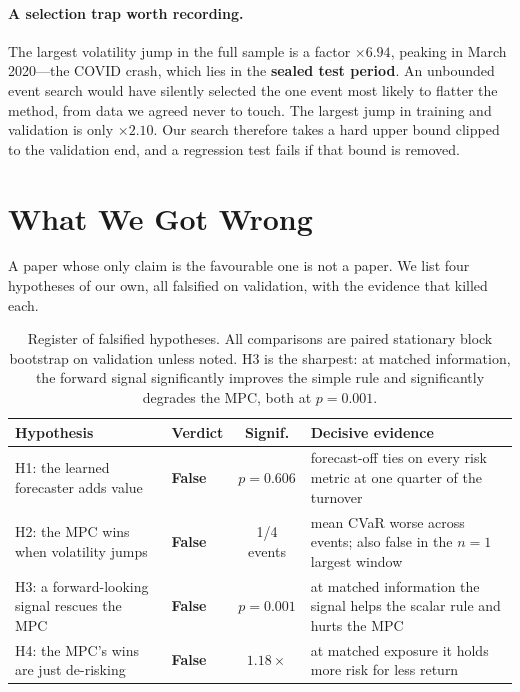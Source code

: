 \documentclass[journal]{IEEEtran}
\begin{document}
\paragraph{A selection trap worth recording.} The largest volatility jump in the
full sample is a factor $\times 6.94$, peaking in March 2020---the COVID crash,
which lies in the \textbf{sealed test period}. An unbounded event search would have
silently selected the one event most likely to flatter the method, from data we
agreed never to touch. The largest jump in training and validation is only
$\times 2.10$. Our search therefore takes a hard upper bound clipped to the
validation end, and a regression test fails if that bound is removed.

\section{What We Got Wrong}
\label{sec:falsified}

A paper whose only claim is the favourable one is not a paper. We list four
hypotheses of our own, all falsified on validation, with the evidence that killed
each.

\begin{table}[!t]
  \centering
  \caption{Register of falsified hypotheses. All comparisons are paired stationary
  block bootstrap on validation unless noted. H3 is the sharpest: at matched
  information, the forward signal significantly improves the simple rule and
  significantly degrades the MPC, both at $p=0.001$.}
  \label{tab:falsified}
  \begin{tabular}{L{4.0cm}L{6.0cm}cL{6.6cm}}
    \toprule
    Hypothesis & Verdict & Signif. & Decisive evidence \\
    \midrule
    H1: the learned forecaster adds value
      & \textbf{False} & $p=0.606$
      & forecast-off ties on every risk metric at one quarter of the turnover \\
    H2: the MPC wins when volatility jumps
      & \textbf{False} & 1/4 events
      & mean CVaR worse across events; also false in the $n{=}1$ largest window \\
    H3: a forward-looking signal rescues the MPC
      & \textbf{False} & $p=0.001$
      & at matched information the signal helps the scalar rule and hurts the MPC \\
    H4: the MPC's wins are just de-risking
      & \textbf{False} & $1.18\times$
      & at matched exposure it holds more risk for less return \\
    \bottomrule
  \end{tabular}
\end{table}
\end{document}
